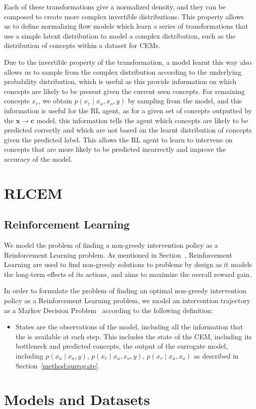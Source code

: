 \documentclass[../main.tex]{subfiles}
\begin{document}
Each of these transformations give a normalized
density, and they can be composed to create more complex invertible distributions.
This property allows us to define normalizing flow models which learn a series of transformations
that use a simple latent distribution to model a complex distribution, such as 
the distribution of concepts within a dataset for CEMs.

Due to the invertible property of the transformation,
a model learnt this way also allows us to sample from the complex distribution
according to the underlying probability distribution, which is useful as
this provide information on which concepts are likely to be present given the current seen concepts.
For remaining concepts $x_r$, we obtain $p(x_r \mid x_u, x_o, y)$ by sampling from the model, 
and this information is useful for the RL agent, as for a given set of concepts outputted by 
the $\mathbf{x} \to \mathbf{c}$ model, this information tells the agent which concepts are likely
to be predicted correctly and which are not based on the learnt distribution of concepts given the
predicted label. This allows the RL agent to learn to intervene on concepts that are 
more likely to be predicted incorrectly and improve the accuracy of the model.



\section{RLCEM}\label{method:rlcem}


\subsection{Reinforcement Learning}

We model the problem of finding a non-greedy intervention policy as a 
Reinforcement Learning problem. As mentioned in Section~\cite{background:rl},
Reinforcement Learning are used to find non-greedy solutions to problems
by design as it models the long-term effects of its actions, and aims to 
maximize the overall reward gain. 

In order to formulate the problem of finding an optimal non-greedy intervention policy
as a Reinforcement Learning problem, we model an intervention
trajectory as a Markov Decision Problem~\cite{rl-mdp} according
to the following definition:
\begin{itemize}
    \item States are the observations of the model, including all the information that the is available
    at each step. This includes the state of the CEM, including its bottleneck and predicted concepts,
    the output of the surrogate model, including $p(x_u \mid x_o, y)$, $p(x_r \mid x_u, x_o, y)$,
    $p(x_r \mid x_u, x_o)$ as described in Section~\ref{method:surrogate}.
\end{itemize}

\section{Models and Datasets}
\end{document}
